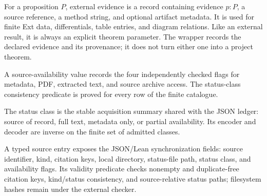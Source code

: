 \begin{definition}
  \label{def:external-evidence}
  \leanok
  For a proposition $P$, external evidence is a record containing evidence
  $p:P$, a source reference, a method string, and optional artifact metadata.
  It is used for finite Ext data, differentials, table entries, and diagram
  relations.  Like an external result, it is always an explicit theorem
  parameter.  The wrapper records the declared evidence and its provenance;
  it does not turn either one into a project theorem.
\end{definition}

\begin{definition}
  \label{def:source-availability}
  \leanok
  A source-availability value records the four independently checked flags for
  metadata, PDF, extracted text, and source archive access.  The status-class
  consistency predicate is proved for every row of the finite catalogue.
\end{definition}

\begin{definition}
  \label{def:source-status-class}
  \leanok
  The status class is the stable acquisition summary shared with the JSON
  ledger: source of record, full text, metadata only, or partial availability.
  Its encoder and decoder are inverse on the finite set of admitted classes.
\end{definition}

\begin{definition}
  \label{def:source-entry}
  \leanok
  A typed source entry exposes the JSON/Lean synchronization fields: source
  identifier, kind, citation keys, local directory, status-file path, status
  class, and availability flags.  Its validity predicate checks nonempty and
  duplicate-free citation keys, kind/status consistency, and source-relative
  status paths; filesystem hashes remain under the external checker.
\end{definition}

